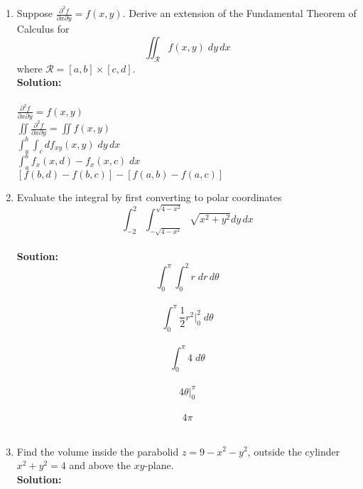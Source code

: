 \documentclass[11pt]{article}
\begin{document}
\begin{enumerate}
\item Suppose $\frac{\partial^2 f}{\partial x \partial y} = f(x,y)$.  Derive an extension of the Fundamental Theorem of Calculus for 
\[ \iint_{\mathcal{R}} f(x,y) \; dy \, dx  \]
where $\mathcal{R} = [a,b] \times [c,d]$.
\\
\textbf{Solution:} \\
\\
$\frac{\partial^2 f}{\partial x \partial y} = f(x,y)$
\\
$\iint \frac{\partial^2 f}{\partial x \partial y} = \iint f(x,y)$
\\
$\int_{a}^{b} \int_{c}{d} f_{xy}(x,y) \; dy \, dx$
\\
$\int_{a}^{b} f_x(x,d)-f_x(x,c) \; dx$ \\
$[f(b,d)-f(b,c)]-[f(a,b)-f(a,c)]$






\item Evaluate the integral by first converting to polar coordinates
\[ \int_{-2}^{2}  \int_{-\sqrt{4-x^2}}^{\sqrt{4-x^2}} \sqrt{x^2+y^2} dy \, dx \]
\\
\textbf{Soution:} \\

\[ \int_{0}^{\pi}  \int_{0}^{2} r \; dr \, d \theta \]
\\
\[ \int_{0}^{\pi}  \frac{1}{2} r^2 |_{0}^{2} \;  d \theta \] \\

\[ \int_{0}^{\pi}  4 \;  d \theta \] \\
\[   4 \theta |_{0}^{\pi}  \] \\
\[   4 \pi  \] \\



    
    
    \item Find the volume inside the parabolid $z = 9-x^2-y^2$, outside the cylinder $x^2 + y^2 = 4$ and above the $xy$-plane.
\\
\textbf{Solution:}




\end{enumerate}
\end{document}

